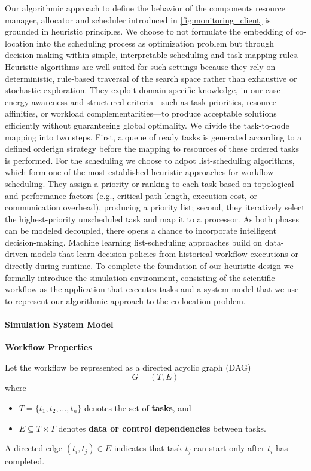 Our algorithmic approach to define the behavior of the components resource manager, allocator and scheduler introduced in \ref{fig:monitoring_client} is grounded in heuristic principles.
We choose to not formulate the embedding of co-location into the scheduling process as optimization problem but through decision-making within simple, interpretable scheduling and task mapping rules. Heuristic algorithms are well suited for such settings because they rely on deterministic, rule-based traversal of the search space rather than exhaustive or stochastic exploration. They exploit domain-specific knowledge, in our case energy-awareness and structured criteria—such as task priorities, resource affinities, or workload complementarities—to produce acceptable solutions efficiently without guaranteeing global optimality. We divide the task-to-node mapping into two steps. First, a queue of ready tasks is generated according to a defined orderign strategy before the mapping to resources of these ordered tasks is performed. For the scheduling we choose to adpot list-scheduling algorithms, which form one of the most established heuristic approaches for workflow scheduling. They assign a priority or ranking to each task based on topological and performance factors (e.g., critical path length, execution cost, or communication overhead), producing a priority list; second, they iteratively select the highest-priority unscheduled task and map it to a processor. As both phases can be modeled decoupled, there opens a chance to incorporate intelligent decision-making.
Machine learning list-scheduling approaches build on data-driven models that learn decision policies from historical workflow executions or directly during runtime. To complete the foundation of our heuristic design we formally introduce the simulation environment, consisting of the scientific workflow as the application that executes tasks and a system model that we use to represent our algorithmic approach to the co-location problem.

\paragraph{Simulation System Model}

\textbf{Workflow Properties}

Let the workflow be represented as a directed acyclic graph (DAG)
\[
    G = (T, E)
\]
where
\begin{itemize}
    \item $T = \{t_1, t_2, \dots, t_n\}$ denotes the set of \textbf{tasks}, and
    \item $E \subseteq T \times T$ denotes \textbf{data or control dependencies} between tasks.
\end{itemize}
A directed edge $(t_i, t_j) \in E$ indicates that task $t_j$ can start only after $t_i$ has completed.

